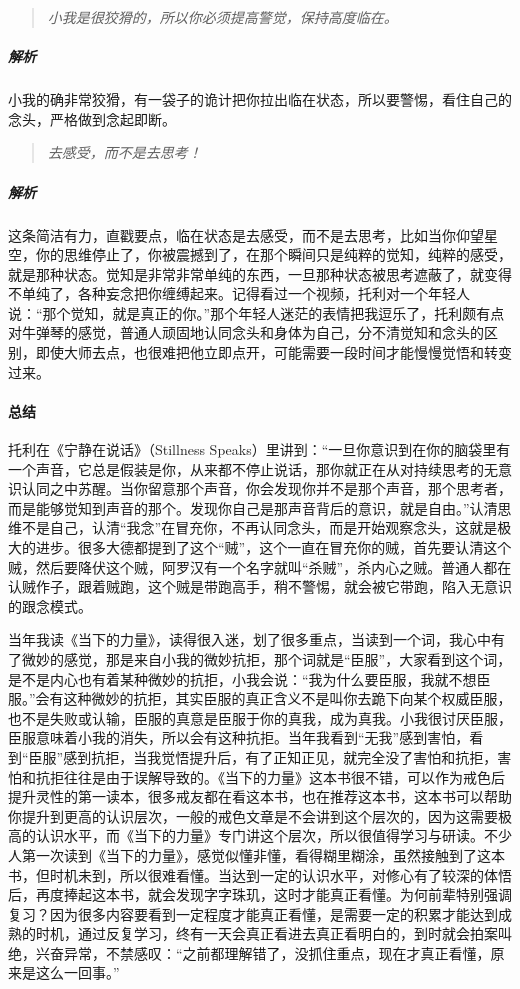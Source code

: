 \begin{quote}\it
    小我是很狡猾的，所以你必须提高警觉，保持高度临在。
\end{quote}

\subparagraph{解析} 小我的确非常狡猾，有一袋子的诡计把你拉出临在状态，所以要警惕，看住自己的念头，严格做到念起即断。

\begin{quote}\it
    去感受，而不是去思考！
\end{quote}

\subparagraph{解析} 这条简洁有力，直戳要点，临在状态是去感受，而不是去思考，比如当你仰望星空，你的思维停止了，你被震撼到了，在那个瞬间只是纯粹的觉知，纯粹的感受，就是那种状态。觉知是非常非常单纯的东西，一旦那种状态被思考遮蔽了，就变得不单纯了，各种妄念把你缠缚起来。记得看过一个视频，托利对一个年轻人说：“那个觉知，就是真正的你。”那个年轻人迷茫的表情把我逗乐了，托利颇有点对牛弹琴的感觉，普通人顽固地认同念头和身体为自己，分不清觉知和念头的区别，即使大师去点，也很难把他立即点开，可能需要一段时间才能慢慢觉悟和转变过来。

\paragraph{总结}

托利在《宁静在说话》（Stillness Speaks）里讲到：“一旦你意识到在你的脑袋里有一个声音，它总是假装是你，从来都不停止说话，那你就正在从对持续思考的无意识认同之中苏醒。当你留意那个声音，你会发现你并不是那个声音，那个思考者，而是能够觉知到声音的那个。发现你自己是那声音背后的意识，就是自由。”认清思维不是自己，认清“我念”在冒充你，不再认同念头，而是开始观察念头，这就是极大的进步。很多大德都提到了这个“贼”，这个一直在冒充你的贼，首先要认清这个贼，然后要降伏这个贼，阿罗汉有一个名字就叫“杀贼”，杀内心之贼。普通人都在认贼作子，跟着贼跑，这个贼是带跑高手，稍不警惕，就会被它带跑，陷入无意识的跟念模式。

当年我读《当下的力量》，读得很入迷，划了很多重点，当读到一个词，我心中有了微妙的感觉，那是来自小我的微妙抗拒，那个词就是“臣服”，大家看到这个词，是不是内心也有着某种微妙的抗拒，小我会说：“我为什么要臣服，我就不想臣服。”会有这种微妙的抗拒，其实臣服的真正含义不是叫你去跪下向某个权威臣服，也不是失败或认输，臣服的真意是臣服于你的真我，成为真我。小我很讨厌臣服，臣服意味着小我的消失，所以会有这种抗拒。当年我看到“无我”感到害怕，看到“臣服”感到抗拒，当我觉悟提升后，有了正知正见，就完全没了害怕和抗拒，害怕和抗拒往往是由于误解导致的。《当下的力量》这本书很不错，可以作为戒色后提升灵性的第一读本，很多戒友都在看这本书，也在推荐这本书，这本书可以帮助你提升到更高的认识层次，一般的戒色文章是不会讲到这个层次的，因为这需要极高的认识水平，而《当下的力量》专门讲这个层次，所以很值得学习与研读。不少人第一次读到《当下的力量》，感觉似懂非懂，看得糊里糊涂，虽然接触到了这本书，但时机未到，所以很难看懂。当达到一定的认识水平，对修心有了较深的体悟后，再度捧起这本书，就会发现字字珠玑，这时才能真正看懂。为何前辈特别强调复习？因为很多内容要看到一定程度才能真正看懂，是需要一定的积累才能达到成熟的时机，通过反复学习，终有一天会真正看进去真正看明白的，到时就会拍案叫绝，兴奋异常，不禁感叹：“之前都理解错了，没抓住重点，现在才真正看懂，原来是这么一回事。”

